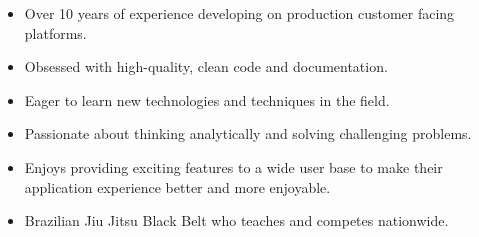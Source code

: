 \documentclass[10pt,a4paper]{resume}
\begin{document}





\begin{fullwidth}
\makecvheader
\end{fullwidth}





\begin{itemize}
\item Over 10 years of experience developing on production customer facing platforms.
\item Obsessed with high-quality, clean code and documentation.
\item Eager to learn new technologies and techniques in the field.
\item Passionate about thinking analytically and solving challenging problems.
\item Enjoys providing exciting features to a wide user base to make their application experience better and more enjoyable.
\item Brazilian Jiu Jitsu Black Belt who teaches and competes nationwide.
\end{itemize}

\end{document}

